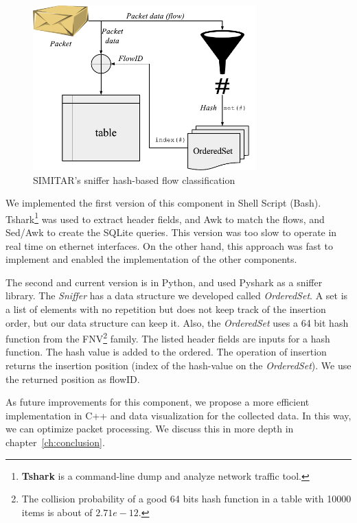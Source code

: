 \begin{figure}[ht!]
        \centering
        \includegraphics[height=2.5in]{figures/ch3/sniffer-classifier}
        \caption{SIMITAR's sniffer hash-based flow classification}
    \label{fig:sniffer}
\end{figure}



We implemented the first version of this component in Shell Script (Bash). Tshark\footnote{\textbf{Tshark} is a command-line dump and analyze network traffic tool.}\cite{web-tshark} was used to extract header fields, and Awk to match the flows, and Sed/Awk to create the SQLite queries. This version was too slow to operate in real time on ethernet interfaces. On the other hand, this approach was fast to implement and enabled the implementation of the other components. 

The second and current version is in Python, and used Pyshark\cite{web-pyshark} as a sniffer library. The \textit{Sniffer} has a data structure we developed called \textit{OrderedSet}. A set is a list of elements with no repetition but does not keep track of the insertion order, but our data structure can keep it. Also, the \textit{OrderedSet} uses a 64 bit hash function from the \acrshort{FNV}\footnote{The collision probability of a good 64 bits hash function in a table with 10000 items is about of $2.71e-12$.} family. The listed header fields are inputs for a hash function. The hash value is added to the ordered. The operation of insertion returns the insertion position (index of the hash-value on the \textit{OrderedSet}). We use the returned position as \acrshort{flowID}.

As future improvements for this component, we propose a more efficient implementation in C++ and data visualization for the collected data. In this way, we can optimize packet processing. We discuss this in more depth in chapter~\ref{ch:conclusion}.

